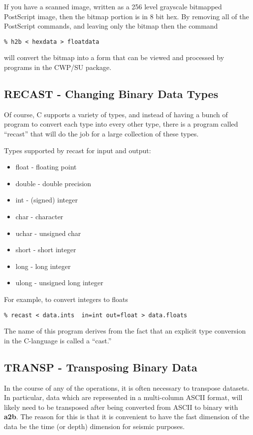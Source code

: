 {{{If you have a scanned image, written as a 256 level grayscale
bitmapped PostScript image, then the bitmap portion is in  8 bit hex.
By removing all of the PostScript commands, and leaving only the
bitmap then the command
{\small\begin{verbatim}
% h2b < hexdata > floatdata
\end{verbatim}}\noindent
will convert the bitmap into a form that can be viewed and processed
by programs in the CWP/SU package.

\subsection{RECAST - Changing Binary Data Types}

Of course, C supports a variety of types, and instead of having
a bunch of program to convert each type into every other type,
there is a program called ``recast'' that will do the job for a
large collection of these types. 

Types supported by recast for input and output:
\begin{itemize}
\item float - floating point
\item double - double precision
\item int - (signed) integer
\item char - character
\item uchar - unsigned char
\item short - short integer
\item long - long integer
\item ulong - unsigned long integer
\end{itemize}
For example, to convert integers to floats
{\small\begin{verbatim}
% recast < data.ints  in=int out=float > data.floats
\end{verbatim}}\noindent
The name of this program derives from the fact that an explicit
type conversion in the C-language is called a ``cast.''

\subsection{TRANSP - Transposing Binary Data}

In the course of any of the operations, it is often necessary
to transpose datasets. In particular, data which are represented
in a multi-column ASCII format, will likely need to be transposed
after being converted from ASCII to binary with {\bf a2b}.
The reason for this is that it is convenient to have the fast
dimension of the data be the time (or depth) dimension
for seismic purposes. 

}}}
